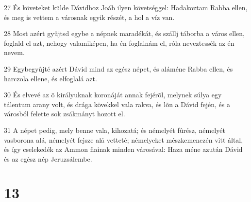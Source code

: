 \par 27 És követeket külde Dávidhoz Joáb ilyen követséggel: Hadakoztam Rabba ellen, és meg is vettem a városnak egyik részét, a hol a víz van.
\par 28 Most azért gyûjtsd egybe a népnek maradékát, és szállj táborba a város ellen, foglald el azt, nehogy valamiképen, ha én foglalnám el, róla neveztessék az én nevem.
\par 29 Egybegyûjté azért Dávid mind az egész népet, és aláméne Rabba ellen, és harczola ellene, és elfoglalá azt.
\par 30 És elvevé az õ királyuknak koronáját annak fejérõl, melynek súlya egy tálentum arany volt, és drága kövekkel vala rakva, és lõn a Dávid fején, és a városból felette sok zsákmányt hozott el.
\par 31 A népet pedig, mely benne vala, kihozatá; és némelyét fûrész, némelyét vasborona alá, némelyét fejsze alá vetteté; némelyeket mészkemenczén vitt által, és így cselekedék az Ammon fiainak minden városával: Haza méne azután Dávid és az egész nép Jeruzsálembe.

\chapter{13}

